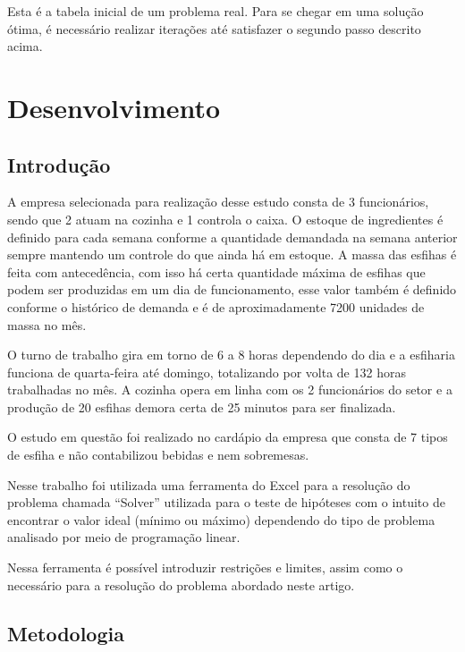 \documentclass[
	12pt,				%
	openright,			%
	oneside,			%
	a4paper,			%
	english,			%
	french,				%
	spanish,			%
	brazil				%
	]{abntex2}
\begin{document}
Esta é a tabela inicial de um problema real. Para se chegar em uma solução ótima, é necessário realizar iterações até satisfazer o segundo passo descrito acima. \cite{unicamp}



\part{Desenvolvimento}


\chapter{Introdução}


A empresa selecionada para realização desse estudo consta de 3 funcionários, sendo que 2 atuam na cozinha e 1 controla o caixa. O estoque de ingredientes é definido para cada semana conforme a quantidade demandada na semana anterior sempre mantendo um controle do que ainda há em estoque. A massa das esfihas é feita com antecedência, com isso há certa quantidade máxima de esfihas que podem ser produzidas em um dia de funcionamento, esse valor também é definido conforme o histórico de demanda e é de aproximadamente 7200 unidades de massa no mês.

O turno de trabalho gira em torno de 6 a 8 horas dependendo do dia e a esfiharia funciona de quarta-feira até domingo, totalizando por volta de 132 horas trabalhadas no mês. A cozinha opera em linha com os 2 funcionários do setor e a produção de 20 esfihas demora certa de 25 minutos para ser finalizada.

O estudo em questão foi realizado no cardápio da empresa que consta de 7 tipos de esfiha e não contabilizou bebidas e nem sobremesas.

Nesse trabalho foi utilizada uma ferramenta do Excel para a resolução do problema chamada “Solver” utilizada para o teste de hipóteses com o intuito de encontrar o valor ideal (mínimo ou máximo) dependendo do tipo de problema analisado por meio de programação linear.

Nessa ferramenta é possível introduzir restrições e limites, assim como o necessário para a resolução do problema abordado neste artigo.


\chapter{Metodologia}
\end{document}
